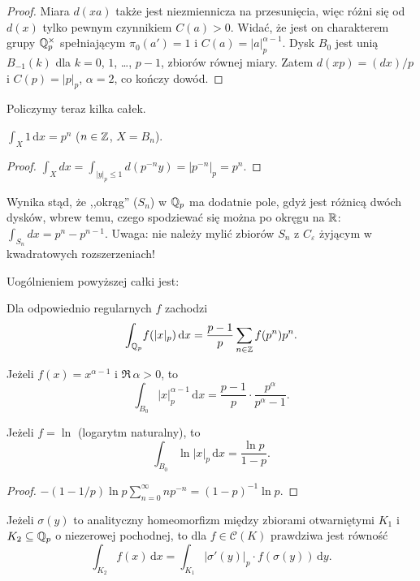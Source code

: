 \begin{proof}
	Miara $d(xa)$ także jest niezmiennicza na przesunięcia, więc różni się od $d(x)$ tylko pewnym czynnikiem $C(a) > 0$.
	Widać, że jest on charakterem grupy $\mathbb Q_p^\times$ spełniającym $\pi_0(a') = 1$ i $C(a) = |a|_p^{\alpha - 1}$.
	Dysk $B_0$ jest unią $B_{-1}(k)$ dla $k = 0$, $1$, \ldots, $p-1$, zbiorów równej miary.
	Zatem $d(xp) = (dx)/p$ i $C(p) = |p|_p$, $\alpha = 2$, co kończy dowód.
\end{proof}

Policzymy teraz kilka całek. %

\begin{przyklad}
	$\int_{X} \! 1 \,\textrm{d}x = p^n$ ($n \in \mathbb Z$, $X = B_n$).
\end{przyklad}

\begin{proof}
	$\int_X dx = \int_{|y|_p \le 1} d(p^{-n}y) = |p^{-n}|_p = p^n$.
\end{proof}

Wynika stąd, że ,,okrąg'' ($S_n$) w $\mathbb Q_p$ ma dodatnie pole, gdyż jest różnicą dwóch dysków, wbrew temu, czego spodziewać się można po okręgu na $\mathbb R$: $\int_{S_n} dx = p^n - p^{n-1}$.
Uwaga: nie należy mylić zbiorów $S_n$ z $C_\varepsilon$ żyjącym w kwadratowych rozszerzeniach!

Uogólnieniem powyższej całki jest:

\begin{fakt}
	Dla odpowiednio regularnych $f$ zachodzi
	\[
		\int_{\mathbb Q_p} \! f(|x|_p) \,\textrm{d}x = \frac{p-1}{p} \sum_{n \in \mathbb Z} f(p^n) p^n.
	\]
\end{fakt}

\begin{wniosek}
	Jeżeli $f (x) = x^{\alpha - 1}$ i $\Re \, \alpha > 0$, to
	\[
		\int_{B_0} |x|_p^{\alpha - 1} \, \textrm{d} x = \frac{p-1}{p} \cdot \frac{p^\alpha}{p^\alpha - 1}.
	\]
\end{wniosek}

\begin{wniosek}
	Jeżeli $f = \ln$ (logarytm naturalny), to 
	\[
		\int_{B_0} \ln |x|_p \, \textrm{d} x = \frac{\ln p}{1 - p}.
	\]
\end{wniosek}

\begin{proof}
	$- (1 - 1/p)\ln p \sum_{n = 0}^\infty n{p^{-n}} = (1-p)^{-1} \ln p$.
\end{proof}

\begin{fakt}
	Jeżeli $\sigma(y)$ to analityczny homeomorfizm między zbiorami otwarniętymi $K_1$ i $K_2 \subseteq \mathbb Q_p$ o niezerowej pochodnej, to dla $f \in \mathcal C(K)$ prawdziwa jest równość
	\[
		\int_{K_2} \!f(x)\,\textrm{d}x = \int_{K_1}\! |\sigma'(y)|_p \cdot f(\sigma(y)) \,\textrm{d}y.
	\]
\end{fakt}

